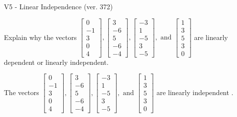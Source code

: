 \begin{exercise}
  \begin{exerciseTitle}V5 - Linear Independence (ver. 372)\end{exerciseTitle}
  \begin{exerciseStatement}
    Explain why the vectors \(\left[\begin{array}{r}
0 \\
-1 \\
3 \\
0 \\
4
\end{array}\right] , \left[\begin{array}{r}
3 \\
-6 \\
5 \\
-6 \\
-4
\end{array}\right] , \left[\begin{array}{r}
-3 \\
1 \\
-5 \\
3 \\
-5
\end{array}\right] , \text{ and } \left[\begin{array}{r}
1 \\
3 \\
5 \\
3 \\
0
\end{array}\right]\) are linearly dependent or linearly independent.	


  \end{exerciseStatement}
  \begin{exerciseAnswer}
   The vectors \(\left[\begin{array}{r}
0 \\
-1 \\
3 \\
0 \\
4
\end{array}\right] , \left[\begin{array}{r}
3 \\
-6 \\
5 \\
-6 \\
-4
\end{array}\right] , \left[\begin{array}{r}
-3 \\
1 \\
-5 \\
3 \\
-5
\end{array}\right] , \text{ and } \left[\begin{array}{r}
1 \\
3 \\
5 \\
3 \\
0
\end{array}\right]\) are 
  	 linearly independent  .
  


  \end{exerciseAnswer}
\end{exercise}